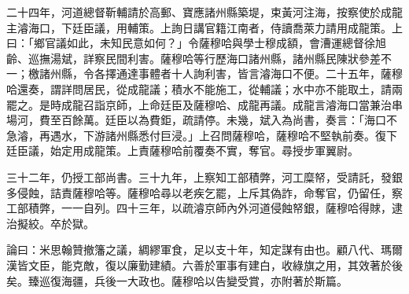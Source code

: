 \begin{pinyinscope}
二十四年，河道總督靳輔請於高郵、寶應諸州縣築堤，束黃河注海，按察使於成龍主濬海口，下廷臣議，用輔策。上詢日講官籍江南者，侍讀喬萊力請用成龍策。上曰：「鄉官議如此，未知民意如何？」令薩穆哈與學士穆成額，會漕運總督徐旭齡、巡撫湯斌，詳察民間利害。薩穆哈等行歷海口諸州縣，諸州縣民陳狀參差不一；檄諸州縣，令各擇通達事體者十人詢利害，皆言濬海口不便。二十五年，薩穆哈還奏，謂詳問居民，從成龍議；積水不能施工，從輔議；水中亦不能取土，請兩罷之。是時成龍召詣京師，上命廷臣及薩穆哈、成龍再議。成龍言濬海口當兼治串場河，費至百餘萬。廷臣以為費鉅，疏請停。未幾，斌入為尚書，奏言：「海口不急濬，再遇水，下游諸州縣悉付巨浸。」上召問薩穆哈，薩穆哈不堅執前奏。復下廷臣議，始定用成龍策。上責薩穆哈前覆奏不實，奪官。尋授步軍翼尉。

三十二年，仍授工部尚書。三十九年，上察知工部積弊，河工糜帑，受請託，發銀多侵蝕，詰責薩穆哈等。薩穆哈尋以老疾乞罷，上斥其偽詐，命奪官，仍留任，察工部積弊，一一自列。四十三年，以疏濬京師內外河道侵蝕帑銀，薩穆哈得賕，逮治擬絞。卒於獄。

論曰：米思翰贊撤籓之議，綢繆軍食，足以支十年，知定謀有由也。顧八代、瑪爾漢皆文臣，能克敵，復以廉勤建績。六善於軍事有建白，收綠旗之用，其效著於後矣。臻巡復海疆，兵後一大政也。薩穆哈以告變受賞，亦附著於斯篇。


\end{pinyinscope}